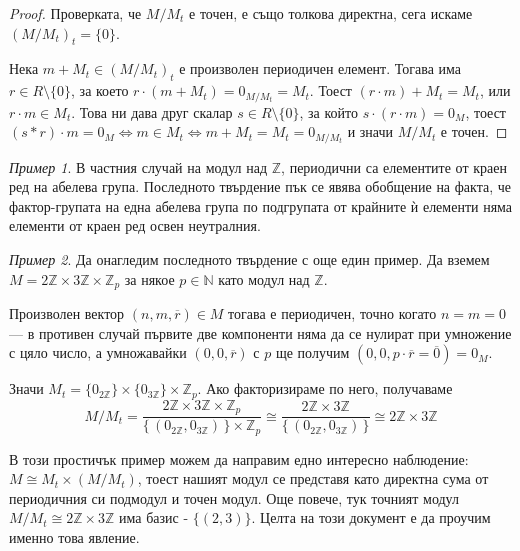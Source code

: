 \documentclass{article}
\newif\ifusemulticols
\theoremstyle{definition}
\theoremstyle{remark}
\newtheorem{example}{Пример}[section]
\theoremstyle{plain}
\theoremstyle{plain}
\newenvironment{mymulticols}
    { \ifusemulticols \begin{multicols}{2} \fi }
    { \ifusemulticols \end{multicols} \fi }
\newcommand{\N}{\mathbb{N}}
\newcommand{\Z}{\mathbb{Z}}
\begin{document}
\begin{mymulticols}
\begin{proof}
    Проверката, че $M / M_t$ е точен, е също толкова директна, сега искаме $(M/M_t)_t = \{0\}$.

    Нека $m + M_t \in (M/M_t)_t$ е произволен периодичен елемент. Тогава има $r \in R \setminus
    \{0\}$, за което $r \cdot (m + M_t) = 0_{M/M_t} = M_t$.
    Тоест $(r\cdot m)+ M_t = M_t$, или $r\cdot m \in M_t$.
    Това ни дава друг скалар $s \in R \setminus \{0\}$, за който $s \cdot (r \cdot m) = 0_M$, тоест
    $(s*r)\cdot m = 0_M \Leftrightarrow m \in M_t \Leftrightarrow m+M_t = M_t = 0_{M/M_t}$ и значи
    $M/M_t$ е точен.
\end{proof}

\begin{example}
    В частния случай на модул над $\Z$, периодични са елементите от краен ред на абелева група.
    Последното твърдение пък се явява обобщение на факта, че фактор-групата на една абелева група по
    подгрупата от крайните ѝ елементи няма елементи от краен ред освен неутралния.
\end{example}

\begin{example}
    \label{example:torsion_ful_less_decomposition}
    Да онагледим последното твърдение с още един пример.
    Да вземем $M = 2 \Z \times 3 \Z \times \Z_p$ за някое $p \in \N$ като модул над $\Z$.

    Произволен вектор $(n, m, \overline r) \in M$ тогава е периодичен, точно когато $n = m = 0$ ---
    в противен случай първите две компоненти няма да се нулират при умножение с цяло число, а
    умножавайки $(0, 0,\overline r)$ с $p$ ще получим $(0, 0, p\cdot \overline r=\overline 0) =
    0_M$.

    Значи $M_t = \{ 0_{2\Z} \} \times \{ 0_{3\Z} \} \times \Z_p$.
    Ако факторизираме по него, получаваме
    \begin{equation*}
        M/M_t
        = \frac{2 \Z \times 3 \Z \times \Z_p}
               {\{ \, \left(0_{2\Z}, 0_{3\Z}\right) \, \} \times \Z_p}
        \cong \frac{2 \Z \times 3 \Z}{ \{\, \left(0_{2\Z}, 0_{3\Z}\right) \,\} }
        \cong 2\Z \times 3\Z
    \end{equation*}

    В този простичък пример можем да направим едно интересно наблюдение: $M \cong M_t \times
    (M/M_t)$, тоест нашият модул се представя като директна сума от периодичния си подмодул и точен
    модул.
    Още повече, тук точният модул $M/M_t \cong 2\Z \times 3\Z$ има базис - $\{(2, 3)\}$.
    Целта на този документ е да проучим именно това явление.
\end{example}


\end{mymulticols}
\end{document}
